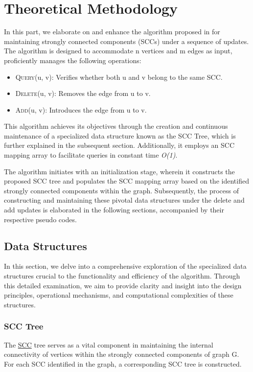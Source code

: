 \section{Theoretical Methodology}\label{Sec: Theoretical Methodology}
In this part, we elaborate on and enhance the algorithm proposed in \cite{scc_tree_reference}
for maintaining strongly connected components (SCCs) under a sequence of updates. 
The algorithm is designed to accommodate n vertices and m edges as input, proficiently manages the following operations:
\begin{itemize}
 \item  \textsc{Query}(u, v): Verifies whether both u and v belong to the same SCC.
 \item  \textsc{Delete}(u, v): Removes the edge from u to v.
\item  \textsc{Add}(u, v): Introduces the edge from u to v.
\end{itemize}

This algorithm achieves its objectives through the creation and continuous maintenance of a specialized data structure known as the SCC Tree, 
which is further explained in the subsequent section. 
Additionally, it employs an SCC mapping array to facilitate queries in constant time \textit{O(1)}.

The algorithm initiates with an initialization stage, wherein it constructs the proposed SCC tree 
and populates the SCC mapping array based on the identified strongly connected components within the graph. 
Subsequently, the process of constructing and maintaining these pivotal data structures under the delete and add updates is elaborated in the following sections, accompanied by their respective pseudo codes.

\subsection{Data Structures}\label{Subsec: Data Structures Theoretical}

In this section, we delve into a comprehensive exploration of the specialized data structures crucial to the functionality 
and efficiency of the algorithm. Through this detailed examination, we aim to provide clarity 
and insight into the design principles, operational mechanisms, and computational complexities of these structures.

\subsubsection{SCC Tree}\label{Subsubsec: SCC Tree}
The \hyperref[scc]{SCC} tree serves as a vital component in maintaining the internal connectivity of vertices within the strongly connected components of graph G. 
For each SCC identified in the graph, a corresponding SCC tree is constructed.

